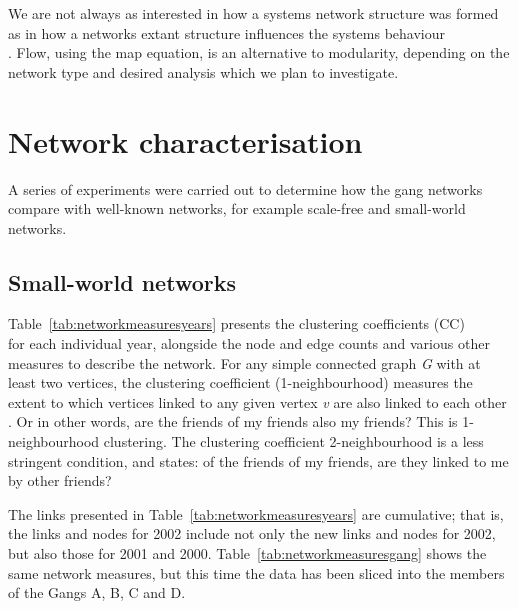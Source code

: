 \documentclass[twocolumn]{svjour3}          %
\theoremstyle{definition}
\begin{document}
We are not always as interested in how a systems network structure was
formed as in how a networks extant structure influences the systems
behaviour\\\citep{rosvall-et-al:2010}. Flow, using the map equation, is
an alternative to modularity, depending on the network type and
desired analysis which we plan to investigate.


\section{Network characterisation}\label{sec:networkcharacteristics}

A series of experiments were carried out to determine how the gang
networks compare with well-known networks, for example scale-free and
small-world networks.

\subsection{Small-world networks}\label{sec:smallworld}

Table~\ref{tab:networkmeasuresyears} presents the clustering
coefficients (CC)\\ \citep{WattsStrogatz1998} for each individual
year, alongside the node and edge counts and various other measures to
describe the network. For any simple connected graph \emph{G} with at
least two vertices, the clustering coefficient (1-neighbourhood)
measures the extent to which vertices linked to any given vertex
\emph{v} are also linked to each other \citep{WattsStrogatz1998}. Or
in other words, are the friends of my friends also my friends? This is
1-neighbourhood clustering. The clustering coefficient 2-neighbourhood
is a less stringent condition, and states: of the friends of my
friends, are they linked to me by other friends?

The links presented in Table~\ref{tab:networkmeasuresyears} are
cumulative; that is, the links and nodes for 2002 include not only the
new links and nodes for 2002, but also those for 2001 and
2000. Table~\ref{tab:networkmeasuresgang} shows the same network
measures, but this time the data has been sliced into the members of
the Gangs A, B, C and D.
\end{document}
